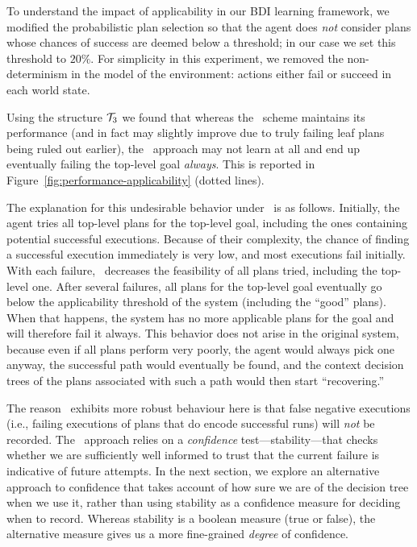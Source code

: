 To understand the impact of applicability in our BDI learning framework, we
modified the probabilistic plan selection so that the agent does \emph{not} consider
plans whose chances of success are deemed below a threshold; in our case we set
this threshold to $20\%$.
For simplicity in this experiment, we  removed the non-determinism in the model of the
environment: actions either fail or succeed in each world state.

Using the structure ${\mathcal{T}}_3$ we found that whereas the \BUL\ scheme maintains its
performance (and in fact may slightly improve due to truly failing leaf plans
being ruled out earlier), the \CL\ approach may not learn at all and
end up eventually failing the top-level goal \emph{always}. This is
reported in Figure~\ref{fig:performance-applicability} (dotted lines).

The explanation for this undesirable behavior under \CL\ is as follows.
Initially, the agent tries all top-level plans for the top-level goal, including
the ones containing potential successful executions. Because of their complexity,
the chance of finding a successful execution immediately is very low, and most
executions fail initially. With each failure, \CL\ decreases the feasibility of
all plans tried, including the top-level one.  After several failures, all plans
for the top-level goal eventually go below the applicability threshold of the
system (including the ``good'' plans). When that happens, the system has no more
applicable plans for the goal and will therefore fail it always.
This behavior does not arise in the original system, because even if all plans
perform very poorly, the agent would always pick one anyway, the successful path
would eventually be found, and the context decision trees of the plans
associated with such a path would then start ``recovering.''


The reason \BUL\ exhibits more robust behaviour here is that false negative
executions (i.e., failing executions of plans that do encode successful
runs) will \emph{not} be recorded.
The \BUL\ approach relies on a \emph{confidence} test---stability---that checks
whether we are sufficiently well informed to trust that the current failure is
indicative of future attempts.
In the next section, we explore an alternative approach to confidence 
that takes account of how sure we are of the decision tree when we use
it, rather than using stability as a confidence measure for deciding when to record.
Whereas stability is a boolean measure (true or false), the alternative measure gives us a more fine-grained \emph{degree} of confidence.
